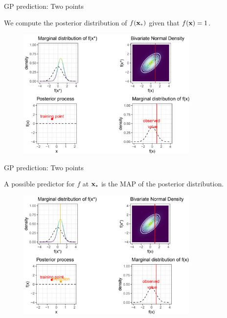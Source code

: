 \begin{frame}{GP prediction: Two points}

\begin{footnotesize}
  We compute the posterior distribution of $f(\mathbf{x}_*)$ given that $f(\mathbf{x}) = 1$. 
\end{footnotesize}\vspace*{0.2cm}


\begin{figure}
  \includegraphics[width=0.8\textwidth]{figure_man/GP04.png}
\end{figure}


\end{frame}
\begin{frame}{GP prediction: Two points}

\begin{footnotesize}
  A possible predictor for $f$ at $\mathbf{x}_*$ is the MAP of the posterior distribution.
\end{footnotesize}\vspace*{0.2cm}

\begin{figure}
  \includegraphics[width=0.8\textwidth]{figure_man/GP05.png}
\end{figure}


\end{frame} 

